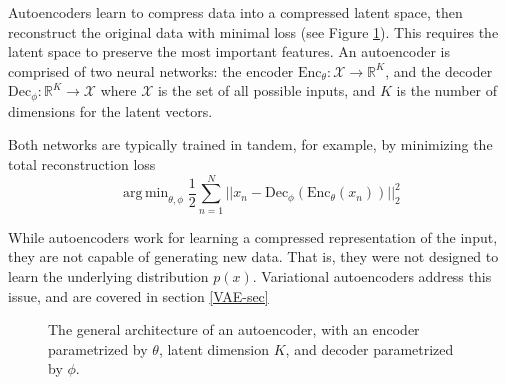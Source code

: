 \documentclass{article}
\DeclareMathOperator*{\argmin}{arg\,min}
\begin{document}
Autoencoders learn to compress data into a compressed latent space, then reconstruct the original data with minimal loss (see Figure \ref{AE}). This requires the latent space to preserve the most important features. An autoencoder is comprised of two neural networks: the encoder \(\text{Enc}_\theta : \mathcal{X}\rightarrow \mathbb{R}^K\), and the decoder \(\text{Dec}_\phi : \mathbb{R}^K\rightarrow \mathcal{X}\) where \(\mathcal{X}\) is the set of all possible inputs, and \(K\) is the number of dimensions for the latent vectors.



Both networks are typically trained in tandem, for example, by minimizing the total reconstruction loss 
\[\argmin_{\theta,\phi} \frac{1}{2}\displaystyle\sum_{n=1}^{N}||x_n-\text{Dec}_\phi(\text{Enc}_\theta(x_n))||_2^2\]

While autoencoders work for learning a compressed representation of the input, they are not capable of generating new data. That is, they were not designed to learn the underlying distribution \(p(x)\). Variational autoencoders \citep{kingma_vae_2013} address this issue, and are covered in section \ref{VAE-sec}

\begin{figure}
  
  \centering
  \caption{The general architecture of an autoencoder, with an encoder parametrized by \(\theta\), latent dimension \(K\), and decoder parametrized by \(\phi\).}
\label{AE}
\end{figure}
\end{document}
